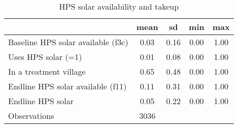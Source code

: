 \begin{table}[htbp]\centering
\def\sym#1{\ifmmode^{#1}\else\(^{#1}\)\fi}
\caption{HPS solar availability and takeup\label {tab1}}
\begin{tabular}{l*{1}{cccc}}
\toprule
                    &        mean&          sd&         min&         max\\
\midrule
Baseline HPS solar available (f3c)&        0.03&        0.16&        0.00&        1.00\\
Uses HPS solar (=1) &        0.01&        0.08&        0.00&        1.00\\
In a treatment village&        0.65&        0.48&        0.00&        1.00\\
Endline HPS solar available (f11)&        0.11&        0.31&        0.00&        1.00\\
Endline HPS solar   &        0.05&        0.22&        0.00&        1.00\\
\midrule
Observations        &        3036&            &            &            \\
\bottomrule
\end{tabular}
\end{table}
